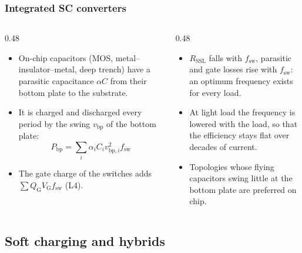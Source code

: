 \begin{frame}
	\frametitle{Integrated SC converters}
	\begin{columns}[T]
		\begin{column}{0.48\textwidth}
			\small
			\begin{itemize}
				\item On-chip capacitors (MOS, metal--insulator--metal, deep trench) have a parasitic capacitance $\alpha C$ from their bottom plate to the substrate.
				\item It is charged and discharged every period by the swing $v_\mathrm{bp}$ of the bottom plate:
				\begin{equation*}
					P_\mathrm{bp}=\sum_i\alpha_iC_iv_{\mathrm{bp},i}^2f_\mathrm{sw}
				\end{equation*}
				\item The gate charge of the switches adds $\sum Q_\mathrm{G}V_\mathrm{G}f_\mathrm{sw}$ (L4).
			\end{itemize}
		\end{column}
		\begin{column}{0.48\textwidth}
			\small
			\begin{itemize}
				\item $R_\mathrm{SSL}$ falls with $f_\mathrm{sw}$, parasitic and gate losses rise with $f_\mathrm{sw}$: an optimum frequency exists for every load.
				\item At light load the frequency is lowered with the load, so that the efficiency stays flat over decades of current.
				\item Topologies whose flying capacitors swing little at the bottom plate are preferred on chip.
			\end{itemize}
		\end{column}
	\end{columns}
\end{frame}

\subsection{Soft charging and hybrids}

